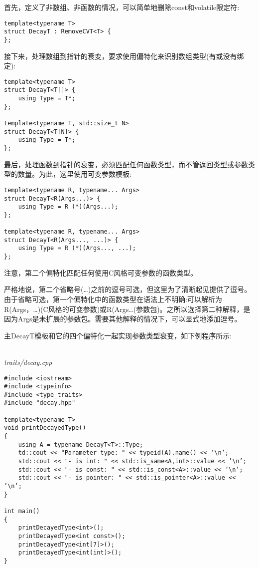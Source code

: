 首先，定义了非数组、非函数的情况，可以简单地删除const和volatile限定符:

\begin{lstlisting}[style=styleCXX]
template<typename T>
struct DecayT : RemoveCVT<T> {
};
\end{lstlisting}

接下来，处理数组到指针的衰变，要求使用偏特化来识别数组类型(有或没有绑定):

\begin{lstlisting}[style=styleCXX]
template<typename T>
struct DecayT<T[]> {
	using Type = T*;
};

template<typename T, std::size_t N>
struct DecayT<T[N]> {
	using Type = T*;
};
\end{lstlisting}

最后，处理函数到指针的衰变，必须匹配任何函数类型，而不管返回类型或参数类型的数量。为此，这里使用可变参数模板:

\begin{lstlisting}[style=styleCXX]
template<typename R, typename... Args>
struct DecayT<R(Args...)> {
	using Type = R (*)(Args...);
};

template<typename R, typename... Args>
struct DecayT<R(Args..., ...)> {
	using Type = R (*)(Args..., ...);
};
\end{lstlisting}

注意，第二个偏特化匹配任何使用C风格可变参数的函数类型。

\begin{tcolorbox}[colback=webgreen!5!white,colframe=webgreen!75!black]
\hspace*{0.75cm}严格地说，第二个省略号(…)之前的逗号可选，但这里为了清晰起见提供了逗号。由于省略可选，第一个偏特化中的函数类型在语法上不明确:可以解析为R(Args，…)(C风格的可变参数)或R(Args…(参数包)。之所以选择第二种解释，是因为Args是未扩展的参数包。需要其他解释的情况下，可以显式地添加逗号。
\end{tcolorbox}

主DecayT模板和它的四个偏特化一起实现参数类型衰变，如下例程序所示:

\hspace*{\fill} \\ %
\noindent
\textit{traits/decay.cpp}
\begin{lstlisting}[style=styleCXX]
#include <iostream>
#include <typeinfo>
#include <type_traits>
#include "decay.hpp"

template<typename T>
void printDecayedType()
{
	using A = typename DecayT<T>::Type;
	td::cout << "Parameter type: " << typeid(A).name() << ’\n’;
	std::cout << "- is int: " << std::is_same<A,int>::value << ’\n’;
	std::cout << "- is const: " << std::is_const<A>::value << ’\n’;
	std::cout << "- is pointer: " << std::is_pointer<A>::value << ’\n’;
}

int main()
{
	printDecayedType<int>();
	printDecayedType<int const>();
	printDecayedType<int[7]>();
	printDecayedType<int(int)>();
}
\end{lstlisting}


